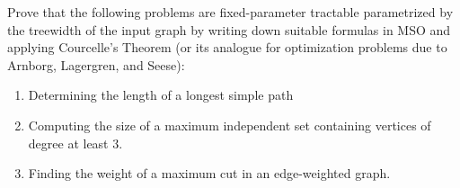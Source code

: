 \documentclass{article}
\begin{document}
\begin{exercise}
    Prove that the following problems are fixed-parameter tractable parametrized by the treewidth of the input graph by writing down suitable formulas in MSO and applying Courcelle's Theorem (or its analogue for optimization problems due to Arnborg, Lagergren, and Seese): \begin{enumerate}
        \item Determining the length of a longest simple path
        \item Computing the size of a maximum independent set containing vertices of degree at least $3$.
        \item Finding the weight of a maximum cut in an edge-weighted graph.
    \end{enumerate}
\end{exercise}
\end{document}
